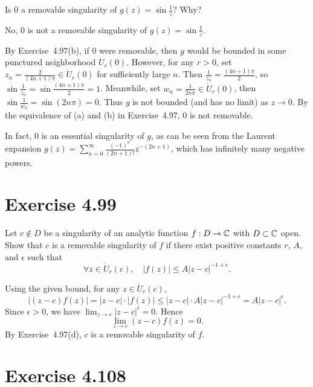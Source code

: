 \documentclass{article}
\begin{document}
Is $0$ a removable singularity of $g(z) = \sin \frac{1}{z}$? Why?

\begin{solution}
  No, $0$ is not a removable singularity of $g(z) = \sin \frac{1}{z}$.

  By Exercise~4.97(b), if $0$ were removable, then $g$ would be bounded in some
  punctured neighborhood $\dot{U}_r(0)$. However, for any $r > 0$, set
  $z_n = \frac{2}{(4n+1)\pi} \in \dot{U}_r(0)$ for sufficiently large $n$.
  Then $\frac{1}{z_n} = \frac{(4n+1)\pi}{2}$, so
  $\sin\frac{1}{z_n} = \sin\frac{(4n+1)\pi}{2} = 1$.
  Meanwhile, set $w_n = \frac{1}{2n\pi} \in \dot{U}_r(0)$, then
  $\sin\frac{1}{w_n} = \sin(2n\pi) = 0$.
  Thus $g$ is not bounded (and has no limit) as $z \to 0$. By the equivalence
  of (a) and (b) in Exercise~4.97, $0$ is not removable.

  In fact, $0$ is an essential singularity of $g$, as can be seen from the
  Laurent expansion $g(z) = \sum_{n=0}^{\infty} \frac{(-1)^n}{(2n+1)!} z^{-(2n+1)}$,
  which has infinitely many negative powers.
\end{solution}

\section{Exercise 4.99}

Let $c \notin D$ be a singularity of an analytic function $f : D \to \mathbb{C}$ with
$D \subset \mathbb{C}$ open. Show that $c$ is a removable singularity of $f$ if there
exist positive constants $r$, $A$, and $\epsilon$ such that
\[
  \forall z \in \dot{U}_r(c), \quad |f(z)| \le A |z - c|^{-1 + \epsilon}.
\]

\begin{solution}
  Using the given bound, for any $z \in \dot{U}_r(c)$,
  \[
    |(z - c)f(z)| = |z - c| \cdot |f(z)|
    \le |z - c| \cdot A |z - c|^{-1 + \epsilon}
    = A |z - c|^{\epsilon}.
  \]
  Since $\epsilon > 0$, we have $\lim_{z \to c} |z - c|^{\epsilon} = 0$. Hence
  \[
    \lim_{z \to c} (z - c)f(z) = 0.
  \]
  By Exercise~4.97(d), $c$ is a removable singularity of $f$.
\end{solution}

\section{Exercise 4.108}
\end{document}
